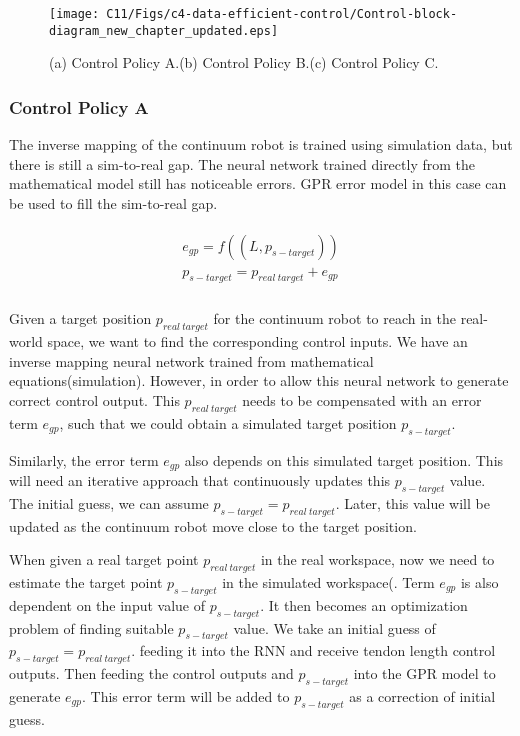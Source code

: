 \begin{figure*}[t]
 \centering
 \texttt{[image: C11/Figs/c4-data-efficient-control/Control-block-diagram\_new\_chapter\_updated.eps]} 
 \caption{(a) Control Policy A.(b) Control Policy B.(c) Control Policy C.}
 \label{fig:X3}
\end{figure*}

\subsubsection{Control Policy A}

The inverse mapping of the continuum robot is trained using simulation data, but there is still a sim-to-real gap. The neural network trained directly from the mathematical model still has noticeable errors. GPR error model in this case can be used to fill the sim-to-real gap. 

\begin{align}
    \begin{split}
        e_{gp} = f((L, p_{s-target}))\\
        p_{s-target} = p_{real\: target} + e_{gp}\\
    \end{split}
    \label{eq:X15}
\end{align}

Given a target position $p_{real\: target}$ for the continuum robot to reach in the real-world space, we want to find the corresponding control inputs. We have an inverse mapping neural network trained from mathematical equations(simulation). However, in order to allow this neural network to generate correct control output. This $p_{real\: target}$ needs to be compensated with an error term $e_{gp}$, such that we could obtain a simulated target position $p_{s-target}$. 

Similarly, the error term $e_{gp}$ also depends on this simulated target position. This will need an iterative approach that continuously updates this $p_{s-target}$ value. The initial guess, we can assume  $p_{s-target} = p_{real\:  target}$. Later, this value will be updated as the continuum robot move close to the target position. 

When given a real target point $p_{real\: target}$ in the real workspace, now we need to estimate the target point $p_{s-target}$ in the simulated workspace(. Term $e_{gp}$ is also dependent on the input value of  $p_{s-target}$. It then becomes an optimization problem of finding suitable $p_{s-target}$ value. We take an initial guess of $p_{s-target} = p_{real\:  target}$. feeding it into the RNN and receive tendon length control outputs. Then feeding the control outputs and $p_{s-target}$ into the GPR model to generate $e_{gp}$. This error term will be added to $p_{s-target}$ as a correction of initial guess.

